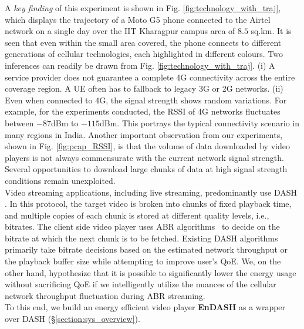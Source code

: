 A \textit{key finding} of this experiment is shown in Fig. \ref{fig:technology_with_traj}, which displays the trajectory of a Moto G5 phone connected to the Airtel network on a single day over the IIT Kharagpur campus area of $8.5$ sq.km. It is seen that even within the small area covered, the phone connects to different generations of cellular technologies, each highlighted in different colours. Two inferences can readily be drawn from Fig. \ref{fig:technology_with_traj}. (i) A service provider does not guarantee a complete \ac{4G} connectivity across the entire coverage region. A \ac{UE} often has to fallback to legacy \ac{3G} or \ac{2G} networks. (ii) Even when connected to \ac{4G}, the signal strength shows random variations. For example, for the experiments conducted, the \ac{RSSI} of \ac{4G} networks fluctuates between $-87$dBm to $-115$dBm. This portrays the typical connectivity scenario in many regions in India.
Another important observation from our experiments, shown in Fig. \ref{fig:pcap_RSSI}, is that the volume of data downloaded by video players is not always commensurate with the current network signal strength. Several opportunities to download large chunks of data at high signal strength conditions remain unexploited. \\
\indent Video streaming applications, including live streaming, predominantly use \ac{DASH} \cite{Stockhammer2011}. In this protocol, the target video is broken into chunks of fixed playback time, and multiple copies of each chunk is stored  at different quality levels, i.e., bitrates.  The client side video player uses \ac{ABR} algorithms~\cite{mao2017neural,Spiteri2016,Yin2015,Raca2019,Akhtar2018}
to decide on the  bitrate at which the next chunk is to be fetched. Existing \ac{DASH} algorithms  primarily take bitrate decisions based on the estimated network throughput or the playback buffer size while attempting to improve user's \ac{QoE}. We, on the other hand, hypothesize that it is possible to significantly lower the energy usage without sacrificing \ac{QoE} if we intelligently utilize the nuances of the cellular network throughput fluctuation during ABR streaming.\\
\indent To this end, we build an energy
efficient video player {\bf EnDASH} as a wrapper over \ac{DASH} (\S\ref{section:sys_overview}). 
